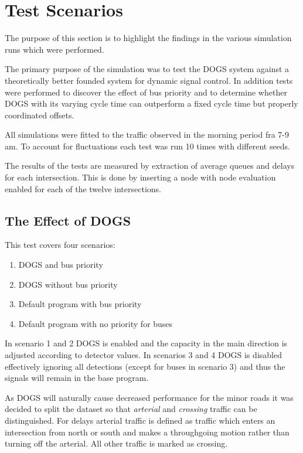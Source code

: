 \section{Test Scenarios}
The purpose of this section is to highlight the findings in the various simulation runs which were performed.

The primary purpose of the simulation was to test the DOGS system against a theoretically better founded system for dynamic signal control. In addition tests were performed to discover the effect of bus priority and to determine whether DOGS with its varying cycle time can outperform a fixed cycle time but properly coordinated offsets.

All simulations were fitted to the traffic observed in the morning period fra 7-9 am.
To account for fluctuations each test was run 10 times with different seeds.

The results of the tests are measured by extraction of average queues and delays for each intersection. This is done by inserting a node with node evaluation enabled for each of the twelve intersections.

\subsection{The Effect of DOGS}
This test covers four scenarios:

\begin{enumerate}
\item DOGS and bus priority
\item DOGS without bus priority
\item Default program with bus priority
\item Default program with no priority for buses
\end{enumerate}

In scenario 1 and 2 DOGS is enabled and the capacity in the main direction is adjusted according to detector values. In scenarios 3 and 4 DOGS is disabled effectively ignoring all detections (except for buses in scenario 3) and thus the signals will remain in the base program.

As DOGS will naturally cause decreased performance for the minor roads it was decided to split the dataset so that \textit{arterial} and \textit{crossing} traffic can be distinguished. For delays arterial traffic is defined as traffic which enters an intersection from north or south and makes a throughgoing motion rather than turning off the arterial. All other traffic is marked as crossing.

